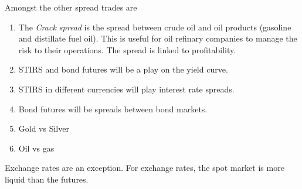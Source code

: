 \documentclass[12pt, a4paper, oneside]{article}\usepackage{graphicx, color}
\begin{document}
Amongst the other spread trades are 
\begin{enumerate}
\item The \emph{Crack spread} is the spread between crude oil and oil products (gasoline and distillate fuel oil).  This is useful for oil refinary companies to manage the risk to their operations. The spread is linked to profitability. 
\item STIRS and bond futures will be a play on the yield curve.
\item STIRS in different currencies will play interest rate spreads. 
\item Bond futures will be spreads between bond markets. 
\item Gold vs Silver 
\item Oil vs gas
\end{enumerate}

Exchange rates are an exception.  For exchange rates, the spot market is more liquid than the futures. 
\end{document}
